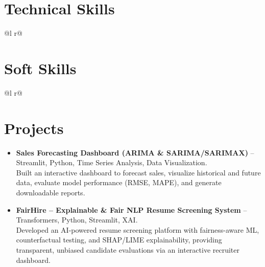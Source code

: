 \documentclass[a4paper,12pt]{article}
\begin{document}
\section{Technical Skills}
\begin{tabularx}{\linewidth}{ @{}l r@{} }
  \\
\end{tabularx}

\section{Soft Skills}
\begin{tabularx}{\linewidth}{ @{}l r@{} }
 \\
\end{tabularx}

\section{Projects}
\begin{itemize}[leftmargin=1.5em,itemsep=0.9em]
  \item \textbf{Sales Forecasting Dashboard (ARIMA \& SARIMA/SARIMAX)} – Streamlit, Python, Time Series Analysis, Data Visualization.\\
  Built an interactive dashboard to forecast sales, visualize historical and future data, evaluate model performance (RMSE, MAPE), and generate downloadable reports.

  \item \textbf{FairHire – Explainable \& Fair NLP Resume Screening System} – Transformers, Python, Streamlit, XAI.\\
  Developed an AI-powered resume screening platform with fairness-aware ML, counterfactual testing, and SHAP/LIME explainability, providing transparent, unbiased candidate evaluations via an interactive recruiter dashboard.
\end{itemize}
\end{document}
